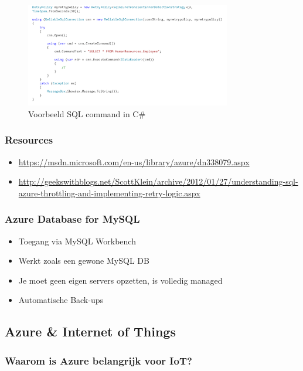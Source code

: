 \documentclass{article}
\begin{document}
\begin{figure}[H]
    \centering
    \includegraphics[width=0.8\textwidth]{azure-sql-command-ex.png}
    \caption{Voorbeeld SQL command in C\#}
\end{figure}


\subsubsection{Resources}
\begin{itemize}
    \item \url{https://msdn.microsoft.com/en-us/library/azure/dn338079.aspx}
    \item \url{http://geekswithblogs.net/ScottKlein/archive/2012/01/27/understanding-sql-azure-throttling-and-implementing-retry-logic.aspx}
\end{itemize}

\subsubsection{Azure Database for MySQL}

\begin{itemize}
    \item Toegang via MySQL Workbench
    \item Werkt zoals een gewone MySQL DB
    \item Je moet geen eigen servers opzetten, is volledig managed
    \item Automatische Back-ups
\end{itemize}

\subsection{Azure \& Internet of Things}

\subsubsection{Waarom is Azure belangrijk voor IoT?}
\end{document}
